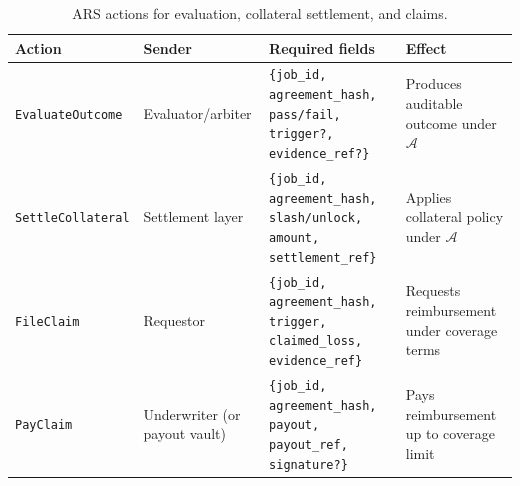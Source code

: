 \begin{table}[!ht]
\centering
\small
\setlength{\tabcolsep}{6pt}
\renewcommand{\arraystretch}{1.25}
\begin{tabular}{p{3.3cm}p{2.2cm}p{4.4cm}p{3.5cm}}
\hline
\textbf{Action} & \textbf{Sender} & \textbf{Required fields} & \textbf{Effect} \\
\hline
\texttt{EvaluateOutcome} & Evaluator/arbiter &
\texttt{\{job\_id, agreement\_hash, pass/fail, trigger?, evidence\_ref?\}} &
Produces auditable outcome under $\mathcal{A}$ \\
\texttt{SettleCollateral} & Settlement layer &
\texttt{\{job\_id, agreement\_hash, slash/unlock, amount, settlement\_ref\}} &
Applies collateral policy under $\mathcal{A}$ \\
\texttt{FileClaim} & Requestor &
\texttt{\{job\_id, agreement\_hash, trigger, claimed\_loss, evidence\_ref\}} &
Requests reimbursement under coverage terms \\
\texttt{PayClaim} & Underwriter (or payout vault) &
\texttt{\{job\_id, agreement\_hash, payout, payout\_ref, signature?\}} &
Pays reimbursement up to coverage limit \\
\hline
\end{tabular}
\caption{\textsc{ARS} actions for evaluation, collateral settlement, and claims.}
\label{tab:arp-actions-settlement}
\end{table}
